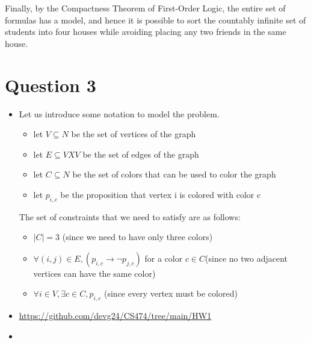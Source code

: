 \documentclass{article}
\begin{document}
Finally, by the Compactness Theorem of First-Order Logic, the entire set of formulas has a model, and hence it is possible to sort the countably infinite set of students into four houses while avoiding placing any two friends in the same house.

\section{Question 3}

\begin{itemize}
    \item Let us introduce some notation to model the problem.
    
    \begin{itemize}
        \item let $V \subseteq N$ be the set of vertices of the graph 
        \item let $E \subseteq V X V$ be the set of edges of the graph
        \item let $C \subseteq N$ be the set of colors that can be used to color the graph
        \item let $p_{i,c}$ be the proposition that vertex i is colored with color c
    \end{itemize}

    The set of constraints that we need to satisfy are as follows:

    \begin{itemize}
        \item $|C| = 3$ (since we need to have only three colors)
        \item $\forall (i,j) \in E, (p_{i,c} \rightarrow \neg{p_{j,c}})$ for a color $c \in C$(since no two adjacent vertices can have the same color)
        \item $\forall i \in V, \exists c \in C, p_{i,c}$ (since every vertex must be colored)
    \end{itemize}
    
    \item \href{https://github.com/devg24/CS474/tree/main/HW1}{https://github.com/devg24/CS474/tree/main/HW1}
    \item 


\end{itemize}
\end{document}

